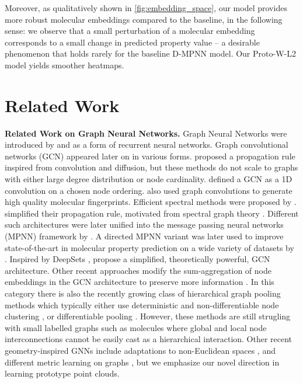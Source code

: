 \documentclass[letterpaper]{article} \usepackage{aaai22}  \usepackage{times}  \usepackage{helvet}  \usepackage{courier}  \usepackage[hyphens]{url}  \usepackage{graphicx} \urlstyle{rm} \def\UrlFont{\rm}  \usepackage{natbib}  \usepackage{caption} \DeclareCaptionStyle{ruled}{labelfont=normalfont,labelsep=colon,strut=off} \frenchspacing  \setlength{\pdfpagewidth}{8.5in}  \setlength{\pdfpageheight}{11in}  \usepackage{algorithm}
\begin{document}
Moreover, as qualitatively shown in \cref{fig:embedding_space}, our model provides more robust molecular embeddings compared to the baseline, in the following sense: we observe that a small perturbation of a molecular embedding corresponds to a small change in predicted property value -- a desirable phenomenon that holds rarely for the baseline D-MPNN model. Our Proto-W-L2 model yields smoother heatmaps.

\section{Related Work} \label{sec:rel}
\textbf{Related Work on Graph Neural Networks. }  Graph Neural Networks were introduced by \cite{gori2005new} and \cite{scarselli2008graph} as a form of recurrent neural networks. Graph convolutional networks (GCN) appeared later on in various forms.  \cite{duvenaud2015convolutional,atwood2016diffusion} proposed a propagation rule inspired from convolution and diffusion, but these methods do not scale to graphs with either large degree distribution or node cardinality. \cite{niepert2016learning} defined a GCN as a 1D convolution on a chosen node ordering.  \cite{kearnes2016molecular} also used graph convolutions to generate high quality molecular fingerprints. Efficient spectral methods were proposed by \cite{bruna2013spectral,NIPS2016_6081}. \cite{kipf2016semi} simplified their propagation rule, motivated from spectral graph theory \citep{hammond2011wavelets}. Different such architectures were later unified into the message passing neural networks (MPNN) framework by \cite{gilmer2017neural}. A directed MPNN variant was later used to improve state-of-the-art in molecular property prediction on a wide variety of datasets by \citep{yang2019analyzing}. Inspired by DeepSets \cite{zaheer2017deep}, \cite{xu2018powerful} propose a  simplified, theoretically powerful, GCN architecture. Other recent approaches modify the sum-aggregation of node embeddings in the GCN architecture to preserve more information \cite{kondor2018covariant,hongbin2020geomgcn}. In this category there is also the recently growing class of hierarchical graph pooling methods which typically either use deterministic and non-differentiable
node clustering \citep{NIPS2016_6081,jin2018junction}, or differentiable pooling \citep{ying2018hierarchical,noutahi2019towards,gao2019graph}. However, these methods are still strugling with small labelled graphs such as molecules where global and local node interconnections cannot be easily cast as a hierarchical interaction. Other recent geometry-inspired GNNs include adaptations to  non-Euclidean spaces \citep{liu2019hyperbolic,chami2019hyperbolic,bachmann2019constant, fey2020deep}, and different metric learning on graphs \citep{riba2018learning, bai2019simgnn, li2019graph}, but we emphasize our novel direction in learning prototype point clouds.
\end{document}
